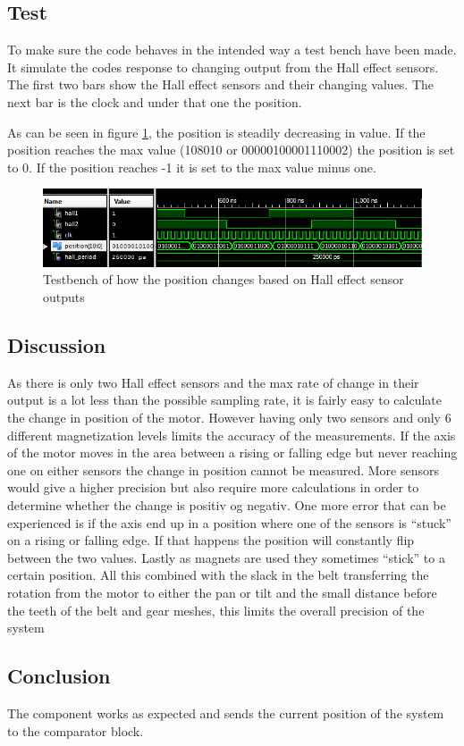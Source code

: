 \subsection{Test}
To make sure the code behaves in the intended way a test bench have been made. It simulate the codes response to changing output from the Hall effect sensors. The first two bars show the Hall effect sensors and their changing values. The next bar is the clock and under that one the position.

As can be seen in figure \ref{fig:Pos_change_testbench}, the position is steadily decreasing in value.
If the position reaches the max value (108010 or 00000100001110002) the position is set to 0. If the position reaches -1 it is set to the max value minus one.

\begin{figure}[h!]
\centering
\includegraphics[scale=0.5]{Billeder/FPGA/Pos_change_testbench.png}
\caption{ Testbench of how the position changes based on Hall effect sensor outputs }
\label{fig:Pos_change_testbench}
\end{figure}

\subsection{Discussion}
As there is only two Hall effect sensors and the max rate of change in their output is a lot less than the possible sampling rate, it is fairly easy to calculate the change in position of the motor. However having only two sensors and only 6 different magnetization levels limits the accuracy of the measurements. If the axis of the motor moves in the area between a rising or falling edge but never reaching one on either sensors the change in position cannot be measured. More sensors would give a higher precision but also require more calculations in order to determine whether the change is positiv og negativ.
One more error that can be experienced is if the axis end up in a position where one of the sensors is “stuck” on a rising or falling edge. If that happens the position will constantly flip between the two values.
Lastly as magnets are used they sometimes “stick” to a certain position.
All this combined with the slack in the belt transferring the rotation from the motor to either the pan or tilt and the small distance before the teeth of the belt and gear meshes, this limits the overall precision of the system

\subsection{Conclusion}

The component works as expected and sends the current position of the system to the comparator block.

